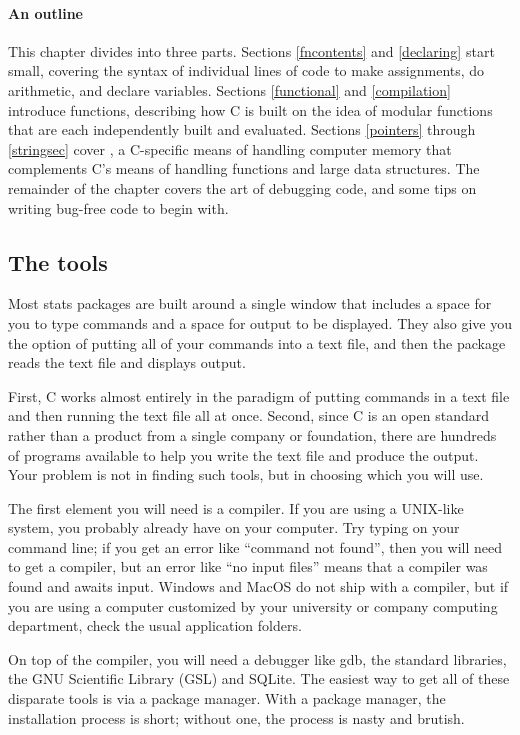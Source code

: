 \paragraph{An outline} 

This chapter divides into three parts.  Sections \ref{fncontents} and
\ref{declaring} start small, covering the syntax of individual lines
of code to make assignments, do arithmetic, and declare variables.
Sections \ref{functional} and \ref{compilation} introduce functions,
describing how C is built on the idea of modular functions that are each
independently built and evaluated.  Sections \ref{pointers} through
\ref{stringsec} cover , a C-specific means of handling
computer memory that complements C's means of handling functions and
large data structures. The remainder of the chapter covers the art of
debugging code, and some tips on writing bug-free code to begin with. 

\subsection{The tools} 
Most stats packages are built around a single window that includes a
space for you to type commands and a space for output to be displayed.
They also give you the option of putting all of your commands into a
text file, and then the package reads the text file and displays output.

First, C works almost entirely in the paradigm of putting commands in a
text file and then running the text file all at once. Second, since
C is an open standard rather than a product from a single company or
foundation, there
are hundreds of programs available to help you write the text file and
produce the output. Your problem is not in finding such tools, but in
choosing which you will use.

The first element you will need is a compiler. If you are using
a UNIX-like system, you probably already have  on your
computer. Try typing  on your command line; if you get an
error like ``command not found'', then you will need to get a compiler,
but an error like ``no input files'' means that a compiler was found
and awaits input. Windows and MacOS do not ship with a compiler, but if you
are using a computer customized by your university or company computing
department, check the usual application folders.

On top of the compiler, you will need a debugger like gdb, the standard
libraries, the GNU Scientific Library (GSL) and SQLite.  The easiest way
to get all of these disparate tools is via a package manager. With a
package manager, the installation process is short; without one,
the process is nasty and brutish.

